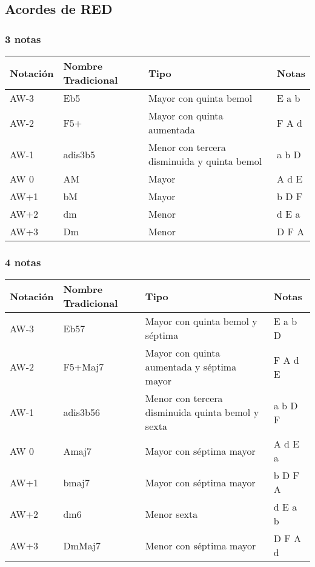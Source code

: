 \documentclass[]{report}
\begin{document}
\subsection*{Acordes de RED}

\subsubsection*{3 notas}

\begin{table}[H]
  \centering
  \begin{tabularx}{\textwidth}{ll>{\raggedright\arraybackslash}Xl}
\toprule
Notación & Nombre Tradicional & Tipo & Notas \\
\midrule
\textsf{AW-3} & Eb5     & Mayor con quinta bemol & E a b \\
\textsf{AW-2} & F5+     & Mayor con quinta aumentada & F A d \\
\textsf{AW-1} & adis3b5 & Menor con tercera disminuida y quinta bemol & a b D \\
\textsf{AW 0} & AM      & Mayor & A d E \\
\textsf{AW+1} & bM      & Mayor & b D F \\
\textsf{AW+2} & dm      & Menor & d E a \\
\textsf{AW+3} & Dm      & Menor & D F A \\ 
\bottomrule
\end{tabularx}
\end{table}

\subsubsection*{4 notas}
\begin{table}[H]
  \centering
  \begin{tabularx}{\textwidth}{ll>{\raggedright\arraybackslash}Xl}
\toprule
Notación & Nombre Tradicional & Tipo & Notas \\
\midrule
\textsf{AW-3} & Eb57     & Mayor con quinta bemol y séptima & E a b D\\
\textsf{AW-2} & F5+Maj7  & Mayor con quinta aumentada y séptima mayor & F A d E\\
\textsf{AW-1} & adis3b56 & Menor con tercera disminuida quinta bemol y sexta & a b D F\\
\textsf{AW 0} & Amaj7    & Mayor con séptima mayor & A d E a \\
\textsf{AW+1} & bmaj7    & Mayor con séptima mayor & b D F A \\
\textsf{AW+2} & dm6      & Menor sexta & d E a b \\
\textsf{AW+3} & DmMaj7   & Menor con séptima mayor & D F A d \\ 
\bottomrule
\end{tabularx}
\end{table}
\end{document}
